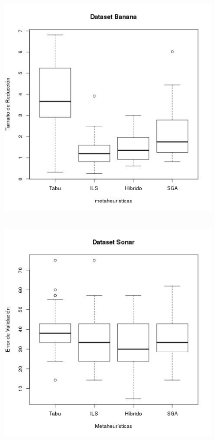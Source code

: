 \documentclass[11pt]{article}
\begin{document}
\begin{figure}[h!]
\begin{center}
  \includegraphics[scale=0.4]{banana_tam_reduc.jpeg}~\\[1cm]
\end{center}
\end{figure}

\begin{figure}[h!]
\begin{center}
  \includegraphics[scale=0.4]{sonar_err_val.jpeg}~\\[1cm]
\end{center}
\end{figure}
\end{document}
